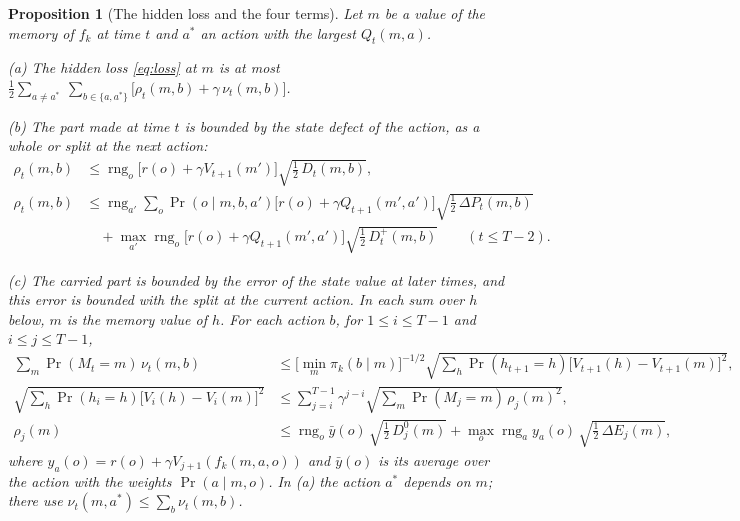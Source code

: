\documentclass[11pt]{article}
\newtheorem{proposition}{Proposition}
\theoremstyle{definition}
\newcommand{\dE}{\Delta E}
\newcommand{\dP}{\Delta P}
\newcommand{\rng}{\operatorname{rng}}
\begin{document}
\begin{proposition}[The hidden loss and the four terms]\label{prop:terms}
Let $m$ be a value of the memory of $f_k$ at time $t$ and $a^*$ an action with the largest $Q_t(m,a)$.

(a) The hidden loss \eqref{eq:loss} at $m$ is at most $\displaystyle\frac12\sum_{a\ne a^*}\ \sum_{b\in\{a,a^*\}}\big[\rho_t(m,b)+\gamma\,\nu_t(m,b)\big]$.

(b) The part made at time $t$ is bounded by the state defect of the action, as a whole or split at the next action:
\begin{align*}
\rho_t(m,b)&\le\rng_o\big[r(o)+\gamma V_{t+1}(m')\big]\sqrt{\tfrac12\,D_t(m,b)},\\
\rho_t(m,b)&\le\rng_{a'}\sum_o\Pr(o\mid m,b,a')\big[r(o)+\gamma Q_{t+1}(m',a')\big]\sqrt{\tfrac12\,\dP_t(m,b)}\\
&\quad+\max_{a'}\rng_o\big[r(o)+\gamma Q_{t+1}(m',a')\big]\sqrt{\tfrac12\,D^+_t(m,b)}\qquad(t\le T-2).
\end{align*}

(c) The carried part is bounded by the error of the state value at later times, and this error is bounded with the split at the current action. In each sum over $h$ below, $m$ is the memory value of $h$. For each action $b$, for $1\le i\le T-1$ and $i\le j\le T-1$,
\begin{align*}
\sum_m\Pr(M_t=m)\,\nu_t(m,b)&\le\big[\min_m\pi_k(b\mid m)\big]^{-1/2}\sqrt{\sum_h\Pr(h_{t+1}=h)\big[V_{t+1}(h)-V_{t+1}(m)\big]^2},\\
\sqrt{\sum_h\Pr(h_i=h)\big[V_i(h)-V_i(m)\big]^2}&\le\sum_{j=i}^{T-1}\gamma^{j-i}\sqrt{\sum_m\Pr(M_j=m)\,\rho_j(m)^2},\\
\rho_j(m)&\le\rng_o\bar y(o)\,\sqrt{\tfrac12\,D^0_j(m)}+\max_o\rng_ay_a(o)\,\sqrt{\tfrac12\,\dE_j(m)},
\end{align*}
where $y_a(o)=r(o)+\gamma V_{j+1}(f_k(m,a,o))$ and $\bar y(o)$ is its average over the action with the weights $\Pr(a\mid m,o)$. In (a) the action $a^*$ depends on $m$; there use $\nu_t(m,a^*)\le\sum_b\nu_t(m,b)$.
\end{proposition}
\end{document}

